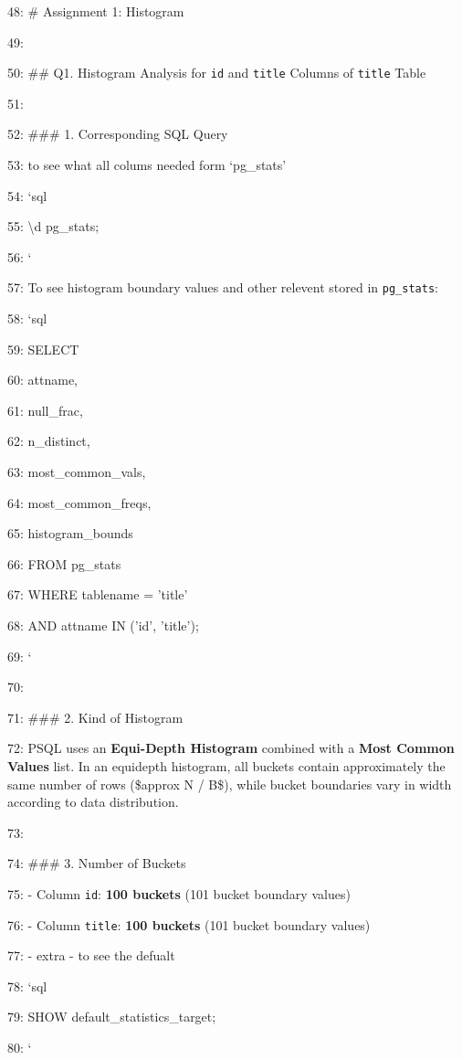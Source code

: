 \documentclass[11pt,a4paper]{article}
\begin{document}
{48: \# Assignment 1: Histogram

49:

50: \#\# Q1. Histogram Analysis for \texttt{id} and \texttt{title} Columns of \texttt{title} Table

51:

52: \#\#\# 1. Corresponding SQL Query

53: to see what all colums needed form `pg\_stats'

54: \texttt{}`sql

55: \textbackslash{}d pg\_stats;

56: \texttt{}`

57: To see histogram boundary values and other relevent  stored in \texttt{pg\_stats}:

58: \texttt{}`sql

59: SELECT

60:     attname,

61:     null\_frac,

62:     n\_distinct,

63:     most\_common\_vals,

64:     most\_common\_freqs,

65:     histogram\_bounds

66: FROM pg\_stats

67: WHERE tablename = 'title'

68:   AND attname IN ('id', 'title');

69: \texttt{}`

70:

71: \#\#\# 2. Kind of Histogram

72: PSQL uses an \textbf{Equi-Depth Histogram} combined with a \textbf{Most Common Values} list. In an equidepth histogram, all buckets contain approximately the same number of rows (\$approx N / B\$), while bucket boundaries vary in width according to data distribution.

73:

74: \#\#\# 3. Number of Buckets

75: - Column \texttt{id}: \textbf{100 buckets} (101 bucket boundary values)

76: - Column \texttt{title}: \textbf{100 buckets} (101 bucket boundary values)

77: - extra -  to see the defualt

78: \texttt{}`sql

79: SHOW default\_statistics\_target;

80: \texttt{}`

}
\end{document}
